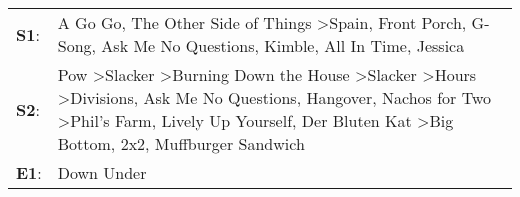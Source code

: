 \begin{supertabular}{p{0.03\textwidth}p{0.92\textwidth}}
 \textbf{S1}:  &                                                                                                                                                                                                                                                                                                                                 A Go Go\textsuperscript{}, \enspace The Other Side of Things\textsuperscript{} \textgreater \enspace Spain\textsuperscript{}, \enspace Front Porch\textsuperscript{}, \enspace G-Song\textsuperscript{}, \enspace Ask Me No Questions\textsuperscript{}, \enspace Kimble\textsuperscript{}, \enspace All In Time\textsuperscript{}, \enspace Jessica\textsuperscript{}  \enspace  \\
 \textbf{S2}:  &  Pow\textsuperscript{} \textgreater \enspace Slacker\textsuperscript{} \textgreater \enspace Burning Down the House\textsuperscript{} \textgreater \enspace Slacker\textsuperscript{} \textgreater \enspace Hours\textsuperscript{} \textgreater \enspace Divisions\textsuperscript{}, \enspace Ask Me No Questions\textsuperscript{}, \enspace Hangover\textsuperscript{}, \enspace Nachos for Two\textsuperscript{} \textgreater \enspace Phil's Farm\textsuperscript{}, \enspace Lively Up Yourself\textsuperscript{}, \enspace Der Bluten Kat\textsuperscript{} \textgreater \enspace Big Bottom\textsuperscript{}, \enspace 2x2\textsuperscript{}, \enspace Muffburger Sandwich\textsuperscript{}  \enspace  \\
 \textbf{E1}:  &                                                                                                                                                                                                                                                                                                                                                                                                                                                                                                                                                                                                                                                                           Down Under\textsuperscript{}  \enspace  \\
\end{supertabular}
